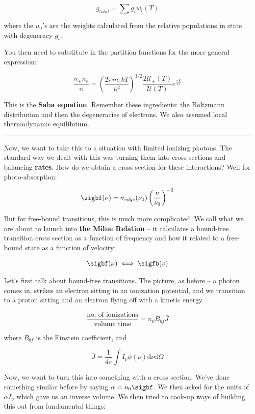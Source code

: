 \documentclass{article}
\begin{document}
$$
g_{total} = \sum g_i w_i\left(T\right)
$$

where the $w_i$'s are the weights calculated from the relative populations in state with degeneracy $g_i$. 

You then need to substitute in the partition functions for the more general expression:

$$
\boxed{\frac{n_+ n_e}{n} = \left(\frac{2\pi m_e kT}{h^2}\right)^{3/2} \frac{2\mathcal{U}_+(T)}{\mathcal{U}(T)} e^{\frac{-\chi}{kT}}}
$$

This is the \textbf{Saha equation}. Remember these ingredients: the Boltzmann distribution and then the degeneracies of electrons. We also assumed local thermodynamic equilibrium.

\par\noindent\rule{\textwidth}{0.4pt}

Now, we want to take this to a situation with limited ionizing photons. The standard way we dealt with this was turning them into cross sections and balancing \textbf{rates}. How do we obtain a cross section for these interactions? Well for photo-absorption:

$$
\sigbf(\nu) = \sigma_{edge}(\nu_0) \left(\frac{\nu}{\nu_0}\right)^{-3}
$$

But for free-bound transitions, this is much more complicated. We call what we are about to launch into \textbf{the Milne Relation} -- it calculates a bound-free transition cross section as a function of frequency and how it related to a free-bound state as a function of velocity:

$$
\sigbf(\nu) \iff \sigfb(v)
$$

Let's first talk about bound-free transitions. The picture, as before -- a photon comes in, strikes an electron sitting in an ionization potential, and we transition to a proton sitting and an electron flying off with a kinetic energy. 

$$
\frac{\text{no. of ionizations}}{\text{volume} \text{ time}} = n_0 B_{bf} \bar{J} 
$$

where $B_{bf}$ is the Einstein coefficient, and

$$
\bar{J} = \frac{1}{4\pi} \int I_\nu \phi(\nu) \mathrm{d}\nu \mathrm{d}\Omega
$$

Now, we want to turn this into something with a cross section. We've done something similar before by saying $\alpha = n_0 \sigbf$. We then asked for the units of $\alpha I_\nu$ which gave us an inverse volume. We then tried to cook-up ways of building this out from fundamental things:
\end{document}
